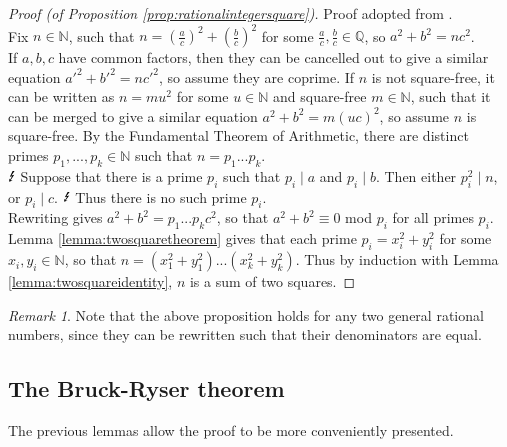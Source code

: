 \documentclass{report}
\newcommand{\N}{\mathbb{N}}
\newcommand{\Q}{\mathbb{Q}}
\theoremstyle{definition}\newtheorem*{definition}{Definition}
\theoremstyle{definition}\newtheorem*{example}{Example}
\theoremstyle{remark}\newtheorem*{remark}{Remark}
\begin{document}
\begin{proof}[Proof (of Proposition \ref{prop:rationalintegersquare})]
Proof adopted from \cite{kahrstrom}. \\
Fix $ n \in \N $, such that $ n = \left( \frac{a}{c} \right)^2 + \left( \frac{b}{c} \right)^2 $ for some $ \frac{a}{c}, \frac{b}{c} \in \Q $, so $ a^2 + b^2 = nc^2 $. \\
If $ a, b, c $ have common factors, then they can be cancelled out to give a similar equation $ a'^2 + b'^2 = nc'^2 $, so assume they are coprime. If $ n $ is not square-free, it can be written as $ n = mu^2 $ for some $ u \in \N $ and square-free $ m \in \N $, such that it can be merged to give a similar equation $ a^2 + b^2 = m (uc)^2 $, so assume $ n $ is square-free. By the Fundamental Theorem of Arithmetic, there are distinct primes $ p_1, ..., p_k \in \N $ such that $ n = p_1 ... p_k $. \\
$ \text{\Lightning} $ Suppose that there is a prime $ p_i $ such that $ p_i \mid a $ and $ p_i \mid b $. Then either $ p_i^2 \mid n $, or $ p_i \mid c $. $ \text{\Lightning} $ Thus there is no such prime $ p_i $. \\
Rewriting gives $ a^2 + b^2 = p_1 ... p_k c^2 $, so that $ a^2 + b^2 \equiv 0 $ mod $ p_i $ for all primes $ p_i $. Lemma \ref{lemma:twosquaretheorem} gives that each prime $ p_i = x_i^2 + y_i^2 $ for some $ x_i, y_i \in \N $, so that $ n = (x_1^2 + y_1^2) ... (x_k^2 + y_k^2) $. Thus by induction with Lemma \ref{lemma:twosquareidentity}, $ n $ is a sum of two squares.
\end{proof}

\begin{remark}
Note that the above proposition holds for any two general rational numbers, since they can be rewritten such that their denominators are equal.
\end{remark}

\pagebreak

\subsection{The Bruck-Ryser theorem}

The previous lemmas allow the proof to be more conveniently presented.
\end{document}
